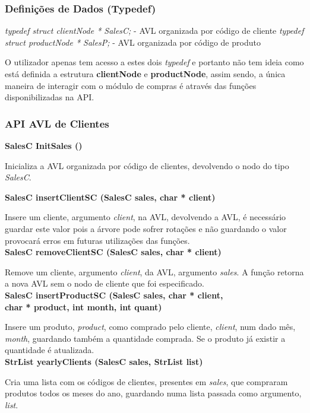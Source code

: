 \documentclass[10pt] {article}
\begin{document}
 \subsubsection{Definições de Dados (Typedef)}
 \emph{typedef struct clientNode * SalesC;} - AVL organizada por código de cliente
 \emph{typedef struct productNode * SalesP;} - AVL organizada por código de produto
 \par O utilizador apenas tem acesso a estes dois \emph{typedef} e portanto não tem ideia como está definida a 
 estrutura \textbf{clientNode} e \textbf{productNode}, assim sendo, a única maneira de interagir com o módulo de 
 compras é através das funções disponibilizadas na API.
 
 \subsubsection{API AVL de Clientes}
\noindent \textbf {SalesC InitSales ()}
\par Inicializa a AVL organizada por código de clientes, devolvendo o nodo do tipo \emph{SalesC}.

\noindent \textbf {SalesC insertClientSC (SalesC sales, char * client)}
\par Insere um cliente, argumento \emph{client}, na AVL, devolvendo a AVL, é necessário guardar este valor
pois a árvore pode sofrer rotações e não guardando o valor provocará erros em futuras utilizações das funções. \\

\noindent \textbf {SalesC removeClientSC (SalesC sales, char * client)}
\par Remove um cliente, argumento \emph{client}, da AVL, argumento \emph{sales}. A função retorna a nova AVL 
sem o nodo de cliente que foi especificado. \\

\noindent \textbf {SalesC insertProductSC (SalesC sales, char * client, \\ char * product, int month, int quant)}
\par Insere um produto, \emph{product}, como comprado pelo cliente, \emph{client}, num dado mês, \emph{month}, 
guardando também a quantidade comprada. Se o produto já existir a quantidade é atualizada. \\

\noindent \textbf {StrList yearlyClients (SalesC sales, StrList list)}
\par Cria uma lista com os códigos de clientes, presentes em \emph{sales}, que compraram produtos todos os 
meses do ano, guardando numa lista passada como argumento, \emph{list}. \\
\end{document}
